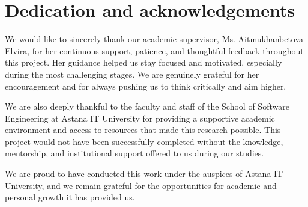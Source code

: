 %
%
\chapter{Dedication and acknowledgements}
\begin{SingleSpace}

We would like to sincerely thank our academic supervisor, Ms. Aitmukhanbetova Elvira, for her continuous support, patience, and thoughtful feedback throughout this project. Her guidance helped us stay focused and motivated, especially during the most challenging stages. We are genuinely grateful for her encouragement and for always pushing us to think critically and aim higher.

We are also deeply thankful to the faculty and staff of the School of Software Engineering at Astana IT University for providing a supportive academic environment and access to resources that made this research possible. This project would not have been successfully completed without the knowledge, mentorship, and institutional support offered to us during our studies.

We are proud to have conducted this work under the auspices of Astana IT University, and we remain grateful for the opportunities for academic and personal growth it has provided us.

\end{SingleSpace}
\clearpage
